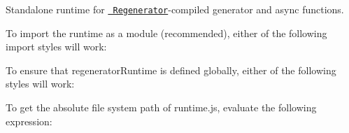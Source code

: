 Standalone runtime for \href{https://github.com/facebook/regenerator}{\texttt{ Regenerator}}-\/compiled generator and {\ttfamily async} functions.

To import the runtime as a module (recommended), either of the following import styles will work\+: 
\begin{DoxyCode}{0}
\DoxyCodeLine{}

\end{DoxyCode}


To ensure that {\ttfamily regenerator\+Runtime} is defined globally, either of the following styles will work\+: 
\begin{DoxyCode}{0}
\DoxyCodeLine{}

\end{DoxyCode}


To get the absolute file system path of {\ttfamily runtime.\+js}, evaluate the following expression\+: 
\begin{DoxyCode}{0}

\end{DoxyCode}
 